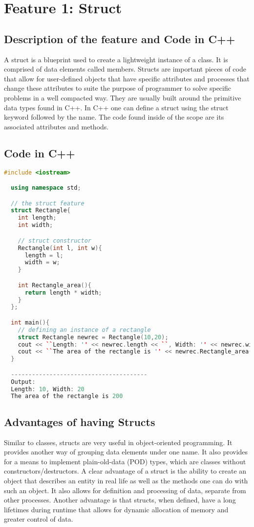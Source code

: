 \documentclass[12pt]{article}
\begin{document}
\fi


\section{Feature 1: Struct}

\subsection{Description of the feature and Code in C++}
A struct is a blueprint used to create a lightweight instance of a class. It is comprised of data elements called members. Structs are important pieces of code that allow for user-defined objects that have specific attributes and processes that change these attributes to suite the purpose of programmer to solve specific problems in a well compacted way. They are usually built around the primitive data types found in C++. In C++ one can define a struct using the struct keyword followed by the name. The code found inside of the scope are its associated attributes and methods. 
\subsection{Code in C++}

\begin{lstlisting}[language=C++ ]
  #include <iostream>

  using namespace std;

  // the struct feature
  struct Rectangle{
    int length;
    int width;

    // struct constructor
    Rectangle(int l, int w){
      length = l;
      width = w;
    }

    int Rectangle_area(){
      return length * width;
    }
  };

  int main(){
    // defining an instance of a rectangle
    struct Rectangle newrec = Rectangle(10,20);
    cout << ``Length: '' << newrec.length << ``, Width: '' << newrec.width << endl;
    cout << ``The area of the rectangle is '' << newrec.Rectangle_area() << endl;
  }

  ---------------------------------------
  Output:
  Length: 10, Width: 20
  The area of the rectangle is 200
\end{lstlisting}

\subsection{Advantages of having Structs}
Similar to classes, structs are very useful in object-oriented programming. It provides another way of grouping data elements under one name. It also provides for a means to implement plain-old-data (POD) types, which are classes without constructors/destructors. A clear advantage of a struct is the ability to create an object that describes an entity in real life as well as the methods one can do with such an object. It also allows for definition and processing of data, separate from other processes. Another advantage is that structs, when defined, have a long lifetimes during runtime that allows for dynamic allocation of memory and greater control of data.
\end{document}
